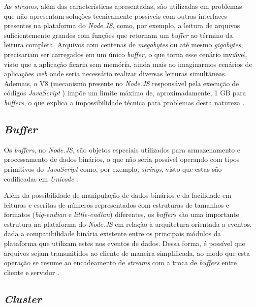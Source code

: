 \documentclass[12pt]{article}
\begin{document}
As \textit{streams}, além das características apresentadas, são utilizadas em problemas que não apresentam soluções tecnicamente
possíveis com outras interfaces presentes na plataforma do \textit{Node.JS}, como, por exemplo, a leitura de 
arquivos suficientemente grandes com funções que retornam um \textit{buffer} ao término da leitura completa. Arquivos com 
centenas de \textit{megabytes} ou até mesmo \textit{gigabytes}, precisariam ser carregados em um único 
\textit{buffer}, o que torna esse cenário inviável, visto que a aplicação ficaria sem memória, ainda mais ao 
imaginarmos cenários de aplicações \textit{web} onde seria necessário realizar diversas leituras simultâneas.
Ademais, o V8 (mecanismo presente no \textit{Node.JS} responsável pela execução de códigos \textit{JavaScript} \cite{NODEV8}) impõe 
um limite máximo de, aproximadamente, 1 GB para \textit{buffers}, o que explica a impossibilidade técnica para problemas 
desta natureza \cite[p. 122]{MARIO}.

\subsection{\textit{Buffer}}

Os \textit{buffers}, no \textit{Node.JS}, são objetos especiais utilizados para armazenamento e processamento 
de dados binários, o que não seria possível operando com tipos primitivos do \textit{JavaScript} como, por exemplo,
\textit{strings}, visto que estas são codificadas em \textit{Unicode} \cite[p. 29]{DIOGORESENDE}.

Além da possibilidade de manipulação de dados binários e da facilidade em leituras e escritas de números representados
com estruturas de tamanhos e formatos (\textit{big-endian} e \textit{little-endian}) diferentes, os \textit{buffers} são uma importante estrutura na plataforma do \textit{Node.JS} em relação à arquitetura
orientada a eventos, dada a compatibilidade binária existente entre os principais módulos da plataforma que 
utilizam estes nos eventos de dados. Dessa forma, é possível que arquivos sejam transmitidos ao cliente de maneira 
simplificada, ao modo que esta operação se resume ao encadeamento de \textit{streams} com a troca de 
\textit{buffers} entre cliente e servidor \cite[p. 29]{DIOGORESENDE}.


\subsection{\textit{Cluster}}
\end{document}
